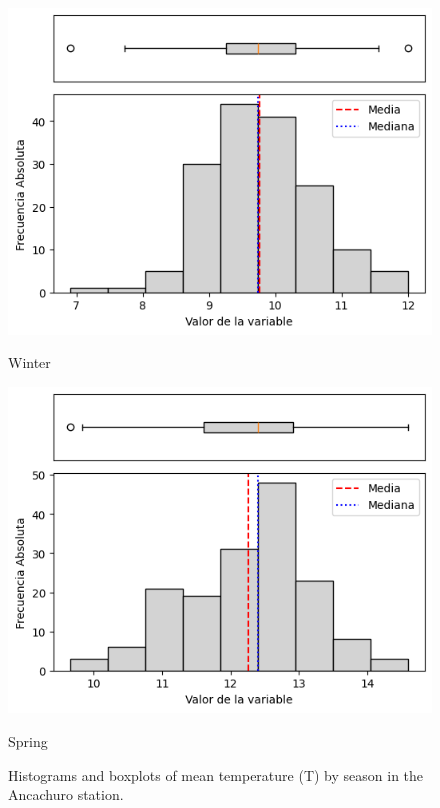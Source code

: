 \begin{figure}[H]
\begin{minipage}{0.30\textwidth}
  \includegraphics[width=\linewidth]{resultados/por_estacion_del_anio/boxplot_clases_por_estacion/Ancachuro/T_HistBoxplot_Winter.png}
  \caption*{Winter}
\end{minipage}
\hfill
\begin{minipage}{0.30\textwidth}
  \includegraphics[width=\linewidth]{resultados/por_estacion_del_anio/boxplot_clases_por_estacion/Ancachuro/T_HistBoxplot_Spring.png}
  \caption*{Spring}
\end{minipage}
\caption{Histograms and boxplots of mean temperature (T) by season in the Ancachuro station.}
\label{fig:ancachuro_t_hist}
\end{figure}

